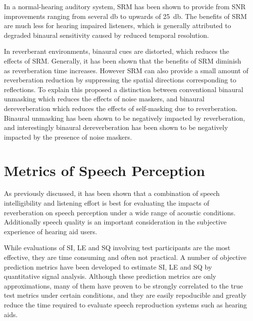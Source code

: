 In a normal-hearing auditory system, SRM has been shown to provide from SNR improvements ranging from several \unit{\decibel} to upwards of \qty{25}{\decibel}. The benefits of SRM are much less for hearing impaired listeners, which is generally attributed to degraded binaural sensitivity caused by reduced temporal resolution. 

In reverberant environments, binaural cues are distorted, which reduces the effects of SRM. Generally, it has been shown that the benefits of SRM diminish as reverberation time increases. However SRM can also provide a small amount of reverberation reduction by suppressing the spatial directions corresponding to reflections. To explain this \cite{leclere2015speech} proposed a distinction between conventional binaural unmasking which reduces the effects of noise maskers, and binaural dereverberation which reduces the effects of self-masking due to reverberation. Binaural unmasking has been shown to be negatively impacted by reverberation, and interestingly binaural dereverberation has been shown to be negatively impacted by the presence of noise maskers.

%

\section{Metrics of Speech Perception}

As previously discussed, it has been shown that a combination of speech intelligibility and listening effort is best for evaluating the impacts of reverberation on speech perception under a wide range of acoustic conditions. Additionally speech quality is an important consideration in the subjective experience of hearing aid users.

While evaluations of SI, LE and SQ involving test participants are the most effective, they are time consuming and often not practical. A number of objective prediction metrics have been developed to estimate SI, LE and SQ by quantitative signal analysis. Although these prediction metrics are only approximations, many of them have proven to be strongly correlated to the true test metrics under certain conditions, and they are easily repoducible and greatly reduce the time required to evaluate speech reproduction systems such as hearing aids. 

